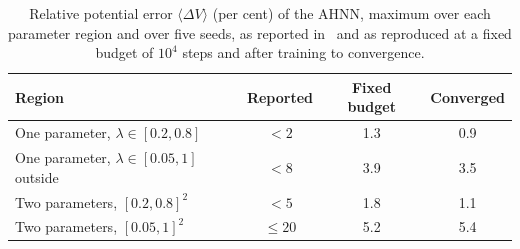 \begin{table}[htbp]
  \centering
  \caption{Relative potential error $\langle\Delta V\rangle$ (per cent) of the AHNN, maximum over each
    parameter region and over five seeds, as reported in~\cite{han2021ahnn} and as reproduced at a fixed
    budget of $10^{4}$ steps and after training to convergence.}
  \label{tab:ahnn-repro}
  \footnotesize\setlength{\tabcolsep}{5pt}
  \begin{tabular}{lccc}
    \toprule
    Region & Reported & Fixed budget & Converged \\
    \midrule
    One parameter, $\lambda\in[0.2,0.8]$ & $<2$ & 1.3 & 0.9 \\
    One parameter, $\lambda\in[0.05,1]$ outside & $<8$ & 3.9 & 3.5 \\
    Two parameters, $[0.2,0.8]^{2}$ & $<5$ & 1.8 & 1.1 \\
    Two parameters, $[0.05,1]^{2}$ & $\le 20$ & 5.2 & 5.4 \\
    \bottomrule
  \end{tabular}
\end{table}
